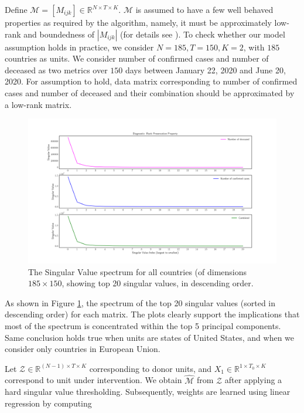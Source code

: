 \documentclass[preprint,authoryear,12pt]{elsarticle}
\begin{document}
	Define $\mathcal{M} = [M_{ijk}] \in \mathbb{R}^{N \times T \times K}$. $\mathcal{M}$ is assumed to have a few well behaved properties as required by the algorithm, namely, it must be approximately low-rank and boundedness of $\left|M_{ijk}\right|$ (for details see \cite{AMSS19}). To check whether our model assumption holds in practice, we consider $N=185, T=150, K=2$, with $185$ countries as units. We consider number of confirmed cases and number of deceased as two metrics over $150$ days between January 22, 2020 and June 20, 2020. For assumption to hold, data matrix corresponding to number of confirmed cases and number of deceased and their combination should be approximated by a low-rank matrix. 
	
	\begin{figure}[ht]
		\includegraphics[width=\textwidth]{rd}
		\caption{The Singular Value spectrum for all countries (of dimensions $185 \times 150$, showing top 20 singular values, in descending order.} 
		\label{fig1} 
	\end{figure}
	
	As shown in Figure \ref{fig1}, the spectrum of the top 20 singular values (sorted in descending order) for each matrix. The plots clearly support the implications that most of the spectrum is concentrated within the top 5 principal components. Same conclusion holds true when units are states of United States, and when we consider only countries in European Union.\par
	
	Let $\mathcal{Z} \in \mathbb{R}^{(N-1) \times T \times K}$ corresponding to donor units, and $X_1 \in \mathbb{R}^{1 \times T_0 \times K}$ correspond to unit under intervention. We obtain $\hat{\mathcal{M}}$ from $\mathcal{Z}$ after applying a hard singular value thresholding. Subsequently, weights are learned using linear regression by computing
	
\end{document}
